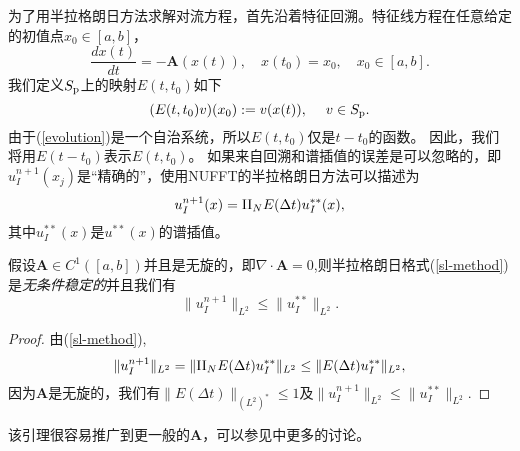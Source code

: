 为了用半拉格朗日方法求解对流方程，首先沿着特征回溯。特征线方程在任意给定的初值点$x_0\in[a,b]$，
\begin{equation}\label{evolution}
\frac{dx(t)}{dt}=-\mathbf{A}(x(t)),\quad x(t_0)=x_0, \quad x_0\in[a,b].
\end{equation}
我们定义$S_{\rm p}$上的映射$E(t,t_{0})$如下
\begin{equation}
(E(t,t_0)v)(x_0):=v(x(t)),\quad \; v\in S_{\rm p}.
\end{equation}
由于(\ref{evolution})是一个自治系统，所以$E(t,t_0)$仅是$t-t_0$的函数。 因此，我们将用$E(t-t_0)$表示$E(t,t_0)$。
如果来自回溯和谱插值的误差是可以忽略的，即$u^{n+1}_I(x_j)$是``精确的''，使用NUFFT的半拉格朗日方法可以描述为
\begin{equation}\label{sl-method}
	u_I^{n+1}(x)={\rm II}_{N}E(\Delta t)u_I^{**}(x),
\end{equation}
其中$u_I^{**}(x)$是$u^{**}(x)$的谱插值。

\begin{lem}\label{sl-stab}
	假设$\mathbf{A}\in C^1([a,b])$并且是无旋的，即$\nabla\cdot\mathbf{A}=0$,则半拉格朗日格式(\ref{sl-method})是\textit{无条件稳定的}并且我们有
	\begin{equation}
		\|u_I^{n+1}\|_{L^2}\leq \|u_I^{**}\|_{L^2}.
	\end{equation}
\end{lem}

\begin{proof}
	由(\ref{sl-method}),
	\begin{equation}
		\|u_I^{n+1}\|_{L^2}=\|{\rm II}_{N}E(\Delta t)u_I^{**}\|_{L^2}\leq \|E(\Delta t)u_I^{**}\|_{L^2},
	\end{equation}
	因为$\mathbf{A}$是无旋的，我们有$\|E(\Delta t)\|_{(L^2)^*}\leq 1$及$\|u_I^{n+1}\|_{L^2}\leq \|u_I^{**}\|_{L^2}$.
\end{proof}
\begin{rem}
该引理很容易推广到更一般的$\mathbf{A}$，可以参见中更多的讨论。
\end{rem}


